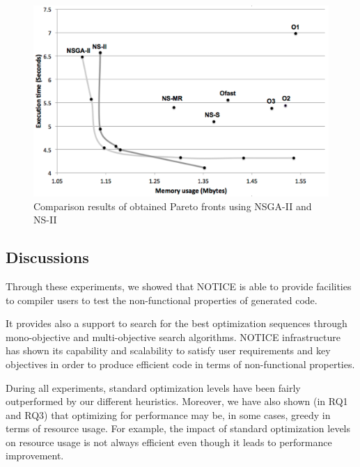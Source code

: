 \begin{figure}[h]
		\centering
		\includegraphics[width=0.9\linewidth]{chapitre3/fig/pareto.pdf}
		\caption{Comparison results of obtained Pareto fronts using NSGA-II and NS-II}
\end{figure}
	
	
\noindent{}
		
\subsection{Discussions}
Through these experiments, we showed that NOTICE is able to provide facilities to compiler users to test the non-functional properties of generated code. 

It provides also a support to search for the best optimization sequences through mono-objective and multi-objective search algorithms. NOTICE infrastructure has shown its capability and scalability to satisfy user requirements and key objectives in order to produce efficient code in terms of non-functional properties. 

During all experiments, standard optimization levels have been fairly outperformed by our different heuristics. 
Moreover, we have also shown (in RQ1 and RQ3) that optimizing for performance may be, in some cases, greedy in terms of resource usage. For example, the impact of standard optimization levels on resource usage is not always efficient even though it leads to performance improvement. 

